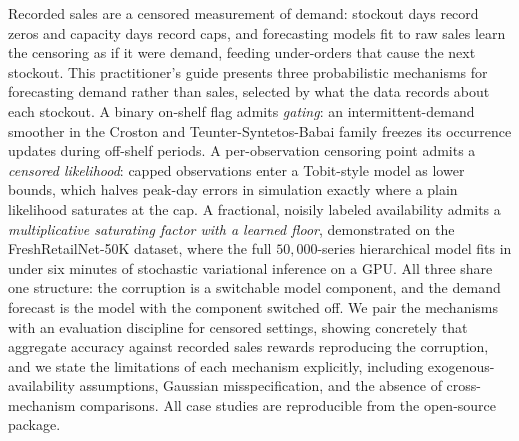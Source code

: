 Recorded sales are a censored measurement of demand: stockout days record zeros and capacity days record caps, and forecasting models fit to raw sales learn the censoring as if it were demand, feeding under-orders that cause the next stockout. This practitioner's guide presents three probabilistic mechanisms for forecasting demand rather than sales, selected by what the data records about each stockout. A binary on-shelf flag admits \emph{gating}: an intermittent-demand smoother in the Croston and Teunter-Syntetos-Babai family freezes its occurrence updates during off-shelf periods. A per-observation censoring point admits a \emph{censored likelihood}: capped observations enter a Tobit-style model as lower bounds, which halves peak-day errors in simulation exactly where a plain likelihood saturates at the cap. A fractional, noisily labeled availability admits a \emph{multiplicative saturating factor with a learned floor}, demonstrated on the FreshRetailNet-50K dataset, where the full $50{,}000$-series hierarchical model fits in under six minutes of stochastic variational inference on a GPU. All three share one structure: the corruption is a switchable model component, and the demand forecast is the model with the component switched off. We pair the mechanisms with an evaluation discipline for censored settings, showing concretely that aggregate accuracy against recorded sales rewards reproducing the corruption, and we state the limitations of each mechanism explicitly, including exogenous-availability assumptions, Gaussian misspecification, and the absence of cross-mechanism comparisons. All case studies are reproducible from the open-source  package.
